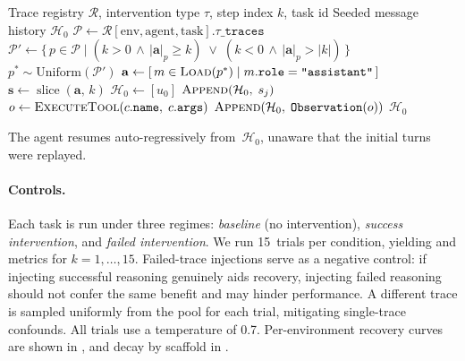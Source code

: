   \begin{algorithm}[H]
  \caption{Trace Intervention at Step $k$}
  \label{alg:trace-intervention}
  \begin{algorithmic}[1]
  \Require Trace registry $\mathcal{R}$, intervention type $\tau$, step index $k$, task id
  \Ensure Seeded message history $\mathcal{H}_0$
  \Statex
  \State $\mathcal{P} \gets \mathcal{R}[\text{env}, \text{agent}, \text{task}].\tau\texttt{\_traces}$ 
  \State $\mathcal{P}' \gets \bigl\{\, p \in \mathcal{P} \;\big|\; (k > 0 \,\land\, |\mathbf{a}|_p \ge k) \;\lor\; (k < 0 \,\land\, |\mathbf{a}|_p > |k|) \,\bigr\}$
  \State $p^{*} \sim \mathrm{Uniform}(\mathcal{P}')$ 
  \State $\mathbf{a} \gets [\,m \in \textsc{Load}(p^{*}) \mid m.\texttt{role} = \texttt{"assistant"}\,]$
  \State $\mathbf{s} \gets \operatorname{slice}(\mathbf{a},\, k)$ 
  \State $\mathcal{H}_0 \gets [u_0]$ 
      \State $\textsc{Append}(\mathcal{H}_0,\; s_j)$ 
          \State $o \gets \textsc{ExecuteTool}(c.\texttt{name},\; c.\texttt{args})$
          \State $\textsc{Append}(\mathcal{H}_0,\; \texttt{Observation}(o))$
      \EndFor
  \EndFor
  \Statex
  \State \Return $\mathcal{H}_0$ 
  \end{algorithmic}
  \end{algorithm}

  The agent resumes auto-regressively from~$\mathcal{H}_0$, unaware that
  the initial turns were replayed.

  \paragraph{Controls.}
  Each task is run under three regimes: \emph{baseline} (no intervention), \emph{success intervention}, and \emph{failed intervention}. We run 15~trials per condition, yielding \passat{} and \passhat{} metrics for $k = 1, \dots, 15$. Failed-trace injections serve as a negative control: if injecting successful reasoning genuinely aids recovery, injecting failed reasoning should not confer the same benefit and may hinder performance. A different trace is sampled uniformly from the pool for each trial, mitigating single-trace confounds. All trials use a temperature of 0.7. Per-environment recovery curves are shown in , and \passat{} decay by scaffold in .

